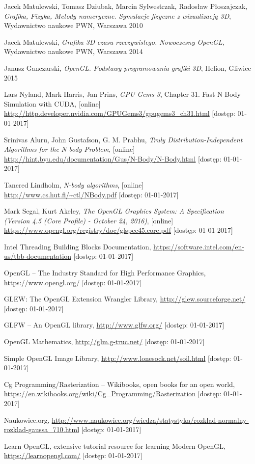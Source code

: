 \documentclass[12pt, twoside, openany]{report}
\begin{document}
\begin{thebibliography}{11}

 Jacek Matulewski, Tomasz Dziubak, Marcin Sylwestrzak, Radosław Płoszajczak, \emph{Grafika, Fizyka, Metody numeryczne. Symulacje fizyczne z wizualizacją 3D}, Wydawnictwo naukowe PWN, Warszawa 2010

 Jacek Matulewski, \emph{Grafika 3D czasu rzeczywistego. Nowoczesny OpenGL}, Wydawnictwo naukowe PWN, Warszawa 2014

 Janusz Ganczarski, \emph{OpenGL. Podstawy programowania grafiki 3D}, Helion, Gliwice 2015

 Lars Nyland, Mark Harris, Jan Prins, \emph{GPU Gems 3}, Chapter 31. Fast N-Body Simulation with CUDA, [online] \url{http://http.developer.nvidia.com/GPUGems3/gpugems3_ch31.html} [dostęp: 01-01-2017]

 Srinivas Aluru, John Gustafson, G. M. Prabhu, \emph{Truly Distribution-Independent Algorithms for the N-body Problem}, [online] \url{http://hint.byu.edu/documentation/Gus/N-Body/N-Body.html} [dostęp: 01-01-2017]

 Tancred Lindholm, \emph{N-body algorithms}, [online] \url{http://www.cs.hut.fi/~ctl/NBody.pdf} [dostęp: 01-01-2017]

 Mark Segal, Kurt Akeley, \emph{The OpenGL Graphics System: A Specification (Version 4.5 (Core Profile) - October 24, 2016)}, [online] \url{https://www.opengl.org/registry/doc/glspec45.core.pdf} [dostęp: 01-01-2017]

 Intel Threading Building Blocks Documentation,  \url{https://software.intel.com/en-us/tbb-documentation} [dostęp: 01-01-2017]

 OpenGL -- The Industry Standard for High Performance Graphics, \url{https://www.opengl.org/} [dostęp: 01-01-2017]

 GLEW: The OpenGL Extension Wrangler Library, \url{http://glew.sourceforge.net/} [dostęp: 01-01-2017]

 GLFW -- An OpenGL library, \url{http://www.glfw.org/} [dostęp: 01-01-2017]

 OpenGL Mathematics, \url{	http://glm.g-truc.net/} [dostęp: 01-01-2017]

 Simple OpenGL Image Library, \url{http://www.lonesock.net/soil.html} [dostęp: 01-01-2017]

 Cg Programming/Rasterization -- Wikibooks, open books for an open world, \url{https://en.wikibooks.org/wiki/Cg_Programming/Rasterization} [dostęp: 01-01-2017]

 Naukowiec.org, \url{http://www.naukowiec.org/wiedza/statystyka/rozklad-normalny-rozklad-gaussa_710.html} [dostęp: 01-01-2017]

 Learn OpenGL, extensive tutorial resource for learning Modern OpenGL, \url{https://learnopengl.com/} [dostęp: 01-01-2017]


\end{thebibliography}
\end{document}
